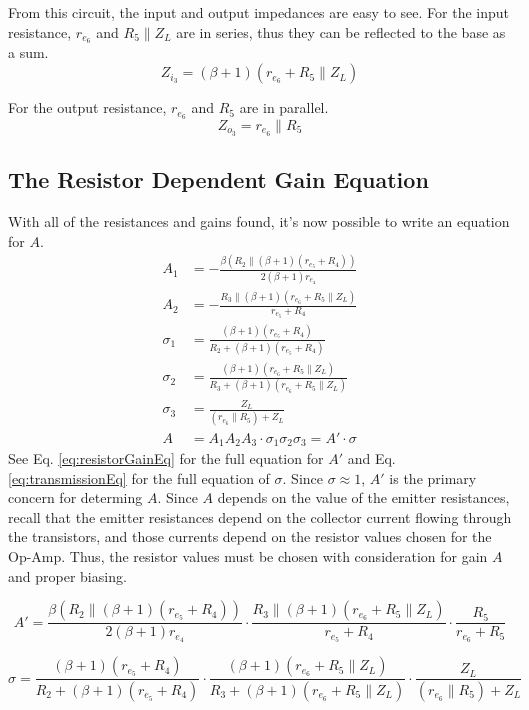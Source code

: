 \documentclass[lettersize,journal]{IEEEtran}
\begin{document}
From this circuit, the input and output impedances are easy to see. 
For the input resistance, $r_{e_6}$ and $R_5\parallel{Z_L}$ are in series, 
thus they can be reflected to the base as a sum. 
\begin{equation}
  \label{stage3inputresist}
  Z_{i_3} = (\beta+1)(r_{e_6} + R_5\parallel Z_L)
\end{equation}

For the output resistance, $r_{e_6}$ and $R_5$ are in parallel.
\begin{equation}
  \label{stage3outputresist}
  Z_{o_3} = r_{e_6} \parallel R_5 
\end{equation}

\subsection{The Resistor Dependent Gain Equation}
With all of the resistances and gains found, it's now possible to 
write an equation for $A$.
{
\begin{align}
  A_1 &= -\frac{\beta (R_2 \parallel (\beta+1) (r_{e_5} + R_4))}{2(\beta+1)r_{e_4}} \\[1ex]
  A_2 &= -\frac{R_3 \parallel (\beta+1)(r_{e_6} + R_5 \parallel Z_L)}{r_{e_5} + R_4} \\[1ex]
  \sigma_1 &= \frac{(\beta+1)(r_{e_5} + R_4)}{R_2  + (\beta+1)(r_{e_5} + R_4)} \\[1ex]
  \sigma_2 &= \frac{(\beta+1)(r_{e_6} + R_5 \parallel Z_L)}{R_3 + (\beta+1)(r_{e_6} + R_5 \parallel Z_L)} \\[1ex]
  \sigma_3 &= \frac{Z_L}{(r_{e_6} \parallel R_5)  + Z_L} \\[1ex]
  A &= A_1 A_2 A_3 \cdot \sigma_1 \sigma_2 \sigma_3 = A' \cdot \sigma
\end{align}}
See Eq. \eqref{eq:resistorGainEq} for the full equation for $A'$ and 
Eq. \ref{eq:transmissionEq} for the full equation of $\sigma$. Since $\sigma\approx1$, 
$A'$ is the primary concern for determing $A$. Since $A$ depends on the value 
of the emitter resistances, recall that the emitter resistances depend on the 
collector current flowing through the transistors, and those currents depend 
on the resistor values chosen for the Op-Amp. Thus, the resistor values must 
be chosen with consideration for gain $A$ and proper biasing.

\begin{figure*}[!t]
\begin{equation}
  \label{eq:resistorGainEq}
  A' = \frac{\beta (R_2 \parallel (\beta+1) (r_{e_5} + R_4))}{2(\beta+1)r_{e_4}} \cdot \frac{R_3 \parallel (\beta+1)(r_{e_6} + R_5 \parallel Z_L)}{r_{e_5} + R_4}\cdot\frac{R_5}{r_{e_6} + R_5}
\end{equation}
\hfill
\end{figure*}
\begin{figure*}[!t]
\begin{equation}
  \label{eq:transmissionEq}
  \sigma = \frac{(\beta+1)(r_{e_5} + R_4)}{R_2  + (\beta+1)(r_{e_5} + R_4)} \cdot \frac{(\beta+1)(r_{e_6} + R_5 \parallel Z_L)}{R_3 + (\beta+1)(r_{e_6} + R_5 \parallel Z_L)} \cdot \frac{Z_L}{(r_{e_6} \parallel R_5)  + Z_L}
\end{equation}
\hrulefill
\end{figure*}
\end{document}
